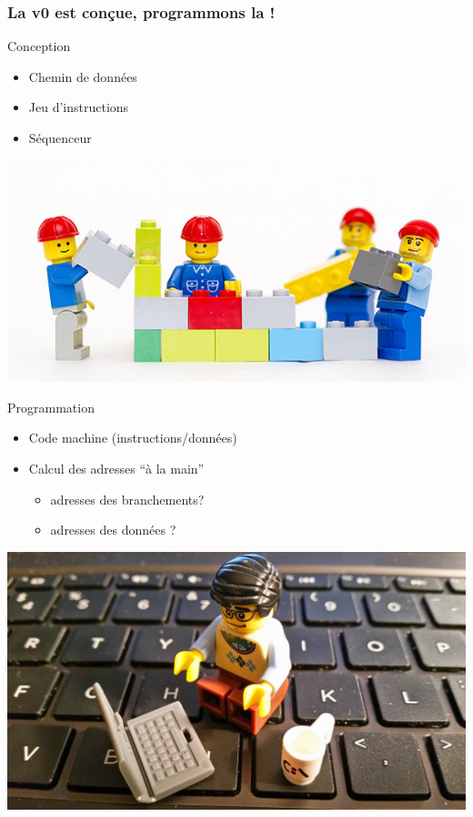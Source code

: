 \documentclass{beamer}
\begin{document}
\begin{frame}
\frametitle{La v0 est conçue, programmons la !}

\begin{block}{Conception}
\begin{minipage}[l]{0.45\linewidth}
\begin{itemize}
\item Chemin de données
\item Jeu d'instructions
\item Séquenceur
\end{itemize}
\end{minipage}
\begin{minipage}[c]{0.5\linewidth}
  \includegraphics[width=\columnwidth]{Figs/lego-builder.jpg}
\end{minipage}
\end{block}
\begin{block}{Programmation}
\begin{minipage}[l]{0.45\linewidth}
\begin{itemize}
\item Code machine (instructions/données)
\item Calcul des adresses ``à la main''
\begin{itemize}
\item adresses des branchements?
\item adresses des données ?
\end{itemize}
\end{itemize}
\end{minipage}
\begin{minipage}[c]{0.5\linewidth}
  \includegraphics[width=\columnwidth]{Figs/lego-programmer.jpg}
\end{minipage}
\end{block}

\end{frame}
\end{document}
